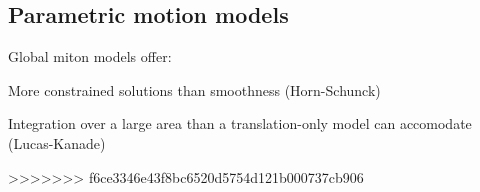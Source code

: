 \begin{compactdesc}
\section{Parametric motion models}
Global miton models offer:\\
\begin{enumerate*}[label=\protect\circled{\arabic*},itemjoin=]
	\item More constrained solutions than smoothness (Horn-Schunck)\\
	\item Integration over a large area than a translation-only model can accomodate (Lucas-Kanade)
\end{enumerate*}
>>>>>>> f6ce3346e43f8bc6520d5754d121b000737cb906
\end{compactdesc}
